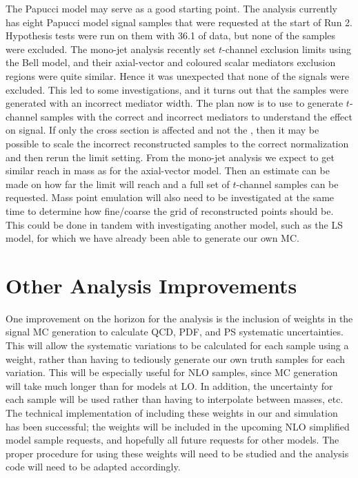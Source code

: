 The Papucci model may serve as a good starting point. The \monoZ analysis currently has eight Papucci model signal samples that were requested at the start of Run 2. Hypothesis tests were run on them with 36.1 \ifb of data, but none of the samples were excluded. The mono-jet analysis recently set $t$-channel exclusion limits using the Bell model, and their axial-vector and coloured scalar mediators exclusion regions were quite similar. Hence it was unexpected that none of the \monoZ signals were excluded. This led to some investigations, and it turns out that the \monoZ samples were generated with an incorrect mediator width. The plan now is to use \madgraph to generate $t$-channel samples with the correct and incorrect mediators to understand the effect on signal. If only the cross section is affected and not the \etmiss, then it may be possible to scale the incorrect reconstructed samples to the correct normalization and then rerun the limit setting. From the mono-jet analysis we expect to get similar reach in mass as for the axial-vector model. Then an estimate can be made on how far the limit will reach and a full set of $t$-channel samples can be requested. Mass point emulation will also need to be investigated at the same time to determine how fine/coarse the grid of reconstructed points should be. This could be done in tandem with investigating another model, such as the LS model, for which we have already been able to generate our own MC.

\section{Other Analysis Improvements}

One improvement on the horizon for the analysis is the inclusion of weights in the signal MC generation to calculate QCD, PDF, and PS systematic uncertainties. This will allow the systematic variations to be calculated for each sample using a weight, rather than having to tediously generate our own truth samples for each variation. This will be especially useful for NLO samples, since MC generation will take much longer than for models at LO. In addition, the uncertainty for each sample will be used rather than having to interpolate between masses, etc. The technical implementation of including these weights in our \madgraph and \pythia simulation has been successful; the weights will be included in the upcoming NLO simplified model sample requests, and hopefully all future requests for other models. The proper procedure for using these weights will need to be studied and the analysis code will need to be adapted accordingly.


